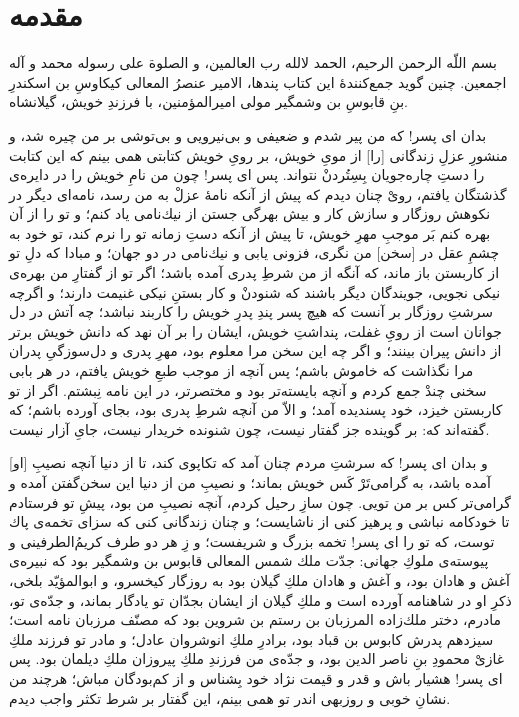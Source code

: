 \section*{مقدمه} 

بسم اللّه الرحمن الرحيم، الحمد لالله رب العالمین، و الصلوة على رسوله محمد و آله اجمعين. چنين گويد جمع‌كنندۀ اين كتاب پندها، الامير عنصرُ المعالى كيكاوسِ بن اسكندرِ بنِ قابوسِ بن وشمگير مولى اميرالمؤمنين، با فرزندِ خويش، گيلانشاه.


بدان اى پسر! كه من پير شدم و ضعيفى و بى‌نيرويى و بى‌توشى بر من چيره شد، و منشورِ عزلِ زندگانى [را] از موىِ خويش، بر روىِ خويش كتابتى همى‌ بينم كه اين كتابت را دستِ چاره‌جويان بِسِتُردنْ نتواند. پس اى پسر! چون من نامِ خويش را در دايره‌ی گذشتگان يافتم، روىْ چنان ديدم كه پيش از آنكه نامۀ عزلْ به من رسد، نامه‌اى ديگر در نكوهش روزگار و سازش كار و بيش بهرگى جستن از نيك‌نامى ياد كنم؛ و تو را از آن بهره كنم بَر موجبِ مهرِ خويش، تا پيش از آنكه دستِ زمانه تو را نرم كند، تو خود به چشمِ عقل در [سخن] من نگرى، فزونى یابى و نيك‌نامى در دو جهان؛ و مبادا كه دلِ تو از كاربستن باز ماند، كه آنگه از من شرطِ پدرى آمده باشد؛ اگر تو از گفتارِ من بهره‌ی نيكى نجويى، جويندگان ديگر باشند كه شنودنْ و كار بستنِ نيكى غنيمت دارند؛ و اگرچه سرشتِ روزگار بر آنست كه هيچ پسر پندِ پدرِ خويش را كاربند نباشد؛ چه آتش در دل جوانان است از روىِ غفلت، پنداشتِ خويش، ايشان را بر آن نهد كه دانش خويش برتر از دانش پيران بينند؛ و اگر چه اين سخن مرا معلوم بود، مهرِ پدرى و دل‌سوزگیِ پدران مرا نگذاشت كه خاموش باشم؛ پس آنچه از موجب طبعِ خويش يافتم، در هر بابى سخنى چندْ جمع كردم و آنچه بايسته‌تر بود و مختصرتر، در اين نامه نِبشتم. اگر از تو كاربستن خيزد، خود پسنديده آمد؛ و الاّ من آنچه شرطِ پدرى بود، بجاى آورده باشم؛ كه گفته‌اند كه: بر گوينده جز گفتار نيست، چون شنونده خريدار نيست، جاىِ آزار نيست.

و بدان اى پسر! كه سرشتِ مردم چنان آمد كه تكاپوى كند، تا از دنيا آنچه نصيبِ [او] آمده باشد، به گرامی‌تَرْ كَس‌ خويش بماند؛ و نصيبِ من از دنيا اين سخن‌گفتن آمده و گرامى‌تر كس بر من تويى. چون سازِ رحيل كردم، آنچه نصيبِ من بود، پيشِ تو فرستادم تا خودكامه نباشى و پرهيز كنى از ناشايست؛ و چنان زندگانى كنى كه سزاى تخمه‌ی پاك توست، كه تو را اى پسر! تخمه بزرگ و شريفست؛ و زِ هر دو طرف كريم‌ُالطرفينى و پيوسته‌ی ملوكِ جهانى: جدّت ملك شمس المعالى قابوس بن وشمگير بود كه نبيره‌ی آغش و هادان بود، و آغش و هادان ملكِ گيلان بود به روزگار كيخسرو، و ابوالمؤيّد بلخى، ذكرِ او در شاهنامه آورده است و ملكِ گيلان از ايشان بجدّان تو يادگار بماند، و جدّه‌ی تو، مادرم، دختر ملك‌زاده المرزبان بن رستم بن شروين بود كه مصنّف مرزبان نامه است؛ سيزدهم پدرش كابوس بن قباد بود، برادرِ ملكِ انوشروان عادل؛ و مادر تو فرزند ملكِ غازىْ محمودِ بنِ ناصر الدين بود، و جدّه‌ی من فرزندِ ملكِ پيروزان ملكِ ديلمان بود. پس اى پسر! هشيار باش و قدر و قيمت نژاد خود بِشناس و از كم‌بودگان مباش؛ هرچند من نشانِ خوبى و روزبهى اندر تو همى بينم، اين گفتار بر شرط تكثر واجب ديدم.


